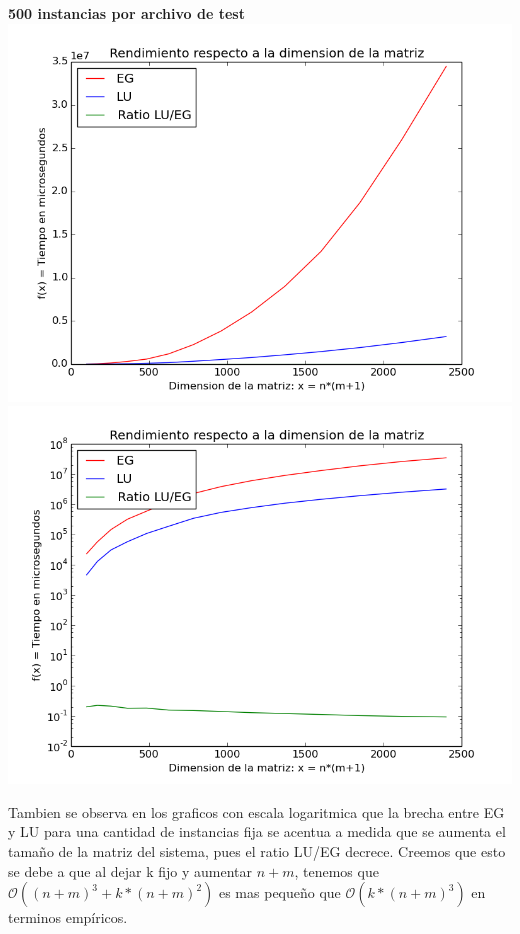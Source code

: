 \begin{center}
\textbf{500 instancias por archivo de test}\\
\includegraphics[scale=0.35]{experimentos2a_2b/gauss_vs_lu_500_inst/gauss_vs_lu_time_consumed_abs.png}
\includegraphics[scale=0.35]{experimentos2a_2b/gauss_vs_lu_500_inst/gauss_vs_lu_time_consumed_log.png}
\end{center}

Tambien se observa en los graficos con escala logaritmica que la brecha entre EG y LU para una cantidad de instancias fija se acentua a medida que se aumenta el tamaño de la matriz del sistema, pues el ratio LU/EG decrece. Creemos que esto se debe a que al dejar k fijo y aumentar $n+m$, tenemos que $\mathcal{O}((n + m)^3 + k*(n + m)^2)$ es mas pequeño que $\mathcal{O}(k*(n + m)^3)$ en terminos empíricos. 


